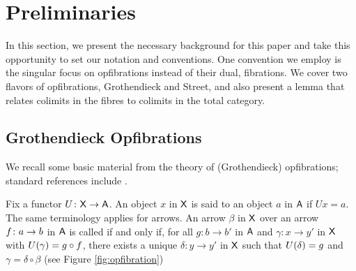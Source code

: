 \documentclass{amsart}
\begin{document}


\setcounter{tocdepth}{1}
\tableofcontents





\section{Preliminaries}\label{sec:preliminaries}

In this section, we present the necessary background for this paper
and take this opportunity to set our notation and conventions. One
convention we employ is the singular focus on opfibrations instead of
their dual, fibrations.  We cover two flavors of opfibrations,
Grothendieck and Street, and also present a lemma that relates
colimits in the fibres to colimits in the total category.

\subsection*{Grothendieck Opfibrations} %

We recall some basic material from the theory of (Grothendieck) opfibrations; standard references include \cite{Handbook2,Grayfibredandcofibred,hermidaphd}. 

Fix a functor $U \colon\mathsf{X} \to \mathsf{A}$. An object $x$ in $\mathsf{X}$ is said to
 an object $a$ in $\mathsf{A}$ if $Ux=a$. The same terminology
applies for arrows. An arrow $\beta$ in $\mathsf{X} $ over an arrow
$f \colon a \to b$ in $\mathsf{A}$ is called  if and only
if, for all $g \colon b \to b'$ in $\mathsf{A}$ and $\gamma \colon x\to y'$ in
$\mathsf{X} $ with $U(\gamma) = g\circ f$, there exists a unique
$\delta \colon y\to y'$ in $\mathsf{X}$ such that $U(\delta) = g$ and
$\gamma = \delta \circ \beta$ (see Figure \ref{fig:opfibration})
\begin{figure} 
\end{figure}
\end{document}
